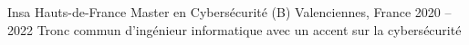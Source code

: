 
\begin{cventries}
  \cventry
    {Insa Hauts-de-France} %
    {Master en Cybersécurité (B)} %
    {Valenciennes, France} %
    {2020 – 2022} %
    {Tronc commun d'ingénieur informatique avec un accent sur la cybersécurité}
    

\end{cventries}
